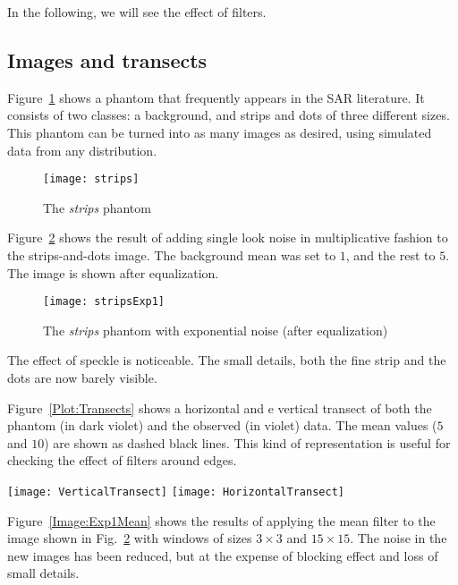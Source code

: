 In the following, we will see the effect of filters.

\subsection{Images and transects}

Figure~\ref{Image:Strips} shows a phantom that frequently appears in the SAR literature\cite{Petty:LAAR:ProtocoloLee}.
It consists of two classes: a background, and strips and dots of three different sizes.
This phantom can be turned into as many images as desired, using simulated data from any distribution.

\begin{figure}[hbt]
\texttt{[image: strips]}
\caption{The \textit{strips} phantom}\label{Image:Strips}
\end{figure}

Figure~\ref{Image:Strips1LookExp} shows the result of adding single look noise in multiplicative fashion to the strips-and-dots image.
The background mean was set to $1$, and the rest to $5$.
The image is shown after equalization.

\begin{figure}[hbt]
	\texttt{[image: stripsExp1]}
	\caption{The \textit{strips} phantom with exponential noise (after equalization)}\label{Image:Strips1LookExp}
\end{figure}

The effect of speckle is noticeable.
The small details, both the fine strip and the dots are now barely visible.

Figure~\ref{Plot:Transects} shows a horizontal and e vertical transect of both the phantom (in dark violet) and the observed (in violet) data.
The mean values ($5$ and $10$) are shown as dashed black lines.
This kind of representation is useful for checking the effect of filters around edges.

\begin{figure*}[hbt]
	\texttt{[image: VerticalTransect]}
	\texttt{[image: HorizontalTransect]}
	\caption{Vertical (left) and horizontal (right) transects}\label{Plot:Transects}
\end{figure*}

Figure~\ref{Image:Exp1Mean} shows the results of applying the mean filter to the image shown in Fig.~\ref{Image:Strips1LookExp} with windows of sizes $3\times3$ and $15\times15$.
The noise in the new images has been reduced, but at the expense of blocking effect and loss of small details.

